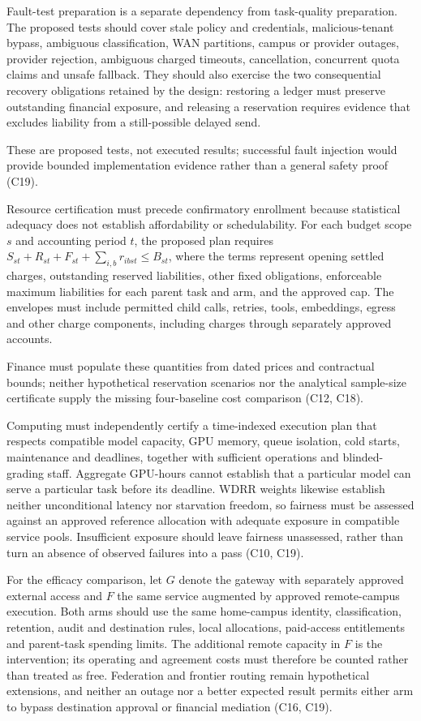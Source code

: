 \documentclass[11pt]{article}
\begin{document}
Fault-test preparation is a separate dependency from task-quality preparation. The proposed tests should cover stale policy and credentials, malicious-tenant bypass, ambiguous classification, WAN partitions, campus or provider outages, provider rejection, ambiguous charged timeouts, cancellation, concurrent quota claims and unsafe fallback. They should also exercise the two consequential recovery obligations retained by the design: restoring a ledger must preserve outstanding financial exposure, and releasing a reservation requires evidence that excludes liability from a still-possible delayed send.

These are proposed tests, not executed results; successful fault injection would provide bounded implementation evidence rather than a general safety proof (C19).

Resource certification must precede confirmatory enrollment because statistical adequacy does not establish affordability or schedulability. For each budget scope $s$ and accounting period $t$, the proposed plan requires $S_{st}+R_{st}+F_{st}+\sum_{i,b}r_{ibst}\leq B_{st}$, where the terms represent opening settled charges, outstanding reserved liabilities, other fixed obligations, enforceable maximum liabilities for each parent task and arm, and the approved cap. The envelopes must include permitted child calls, retries, tools, embeddings, egress and other charge components, including charges through separately approved accounts.

Finance must populate these quantities from dated prices and contractual bounds; neither hypothetical reservation scenarios nor the analytical sample-size certificate supply the missing four-baseline cost comparison (C12, C18).

Computing must independently certify a time-indexed execution plan that respects compatible model capacity, GPU memory, queue isolation, cold starts, maintenance and deadlines, together with sufficient operations and blinded-grading staff. Aggregate GPU-hours cannot establish that a particular model can serve a particular task before its deadline. WDRR weights likewise establish neither unconditional latency nor starvation freedom, so fairness must be assessed against an approved reference allocation with adequate exposure in compatible service pools. Insufficient exposure should leave fairness unassessed, rather than turn an absence of observed failures into a pass (C10, C19).

For the efficacy comparison, let $G$ denote the gateway with separately approved external access and $F$ the same service augmented by approved remote-campus execution. Both arms should use the same home-campus identity, classification, retention, audit and destination rules, local allocations, paid-access entitlements and parent-task spending limits. The additional remote capacity in $F$ is the intervention; its operating and agreement costs must therefore be counted rather than treated as free. Federation and frontier routing remain hypothetical extensions, and neither an outage nor a better expected result permits either arm to bypass destination approval or financial mediation (C16, C19).
\end{document}
